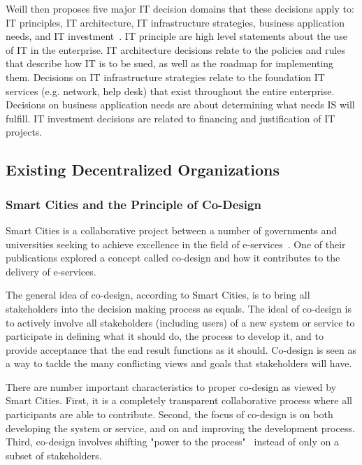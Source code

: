 Weill then proposes five major IT decision domains that these decisions apply to: IT principles, IT architecture, IT infrastructure strategies, business application needs, and IT investment~\cite{Weill2004}. IT principle are high level statements about the use of IT in the enterprise. IT architecture decisions relate to the policies and rules that describe how IT is to be sued, as well as the roadmap for implementing them. Decisions on IT infrastructure strategies relate to the foundation IT services (e.g. network, help desk) that exist throughout the entire enterprise.  Decisions on business application needs are about determining what needs IS will fulfill. IT investment decisions are related to financing and justification of IT projects.




\subsection{Existing Decentralized Organizations}

\subsubsection{Smart Cities and the Principle of Co-Design}

Smart Cities is a collaborative project between a number of governments and universities seeking to achieve excellence in the field of e-services~\cite{Cities}. One of their publications explored a concept called co-design and how it contributes to the delivery of e-services. 


The general idea of co-design, according to Smart Cities, is to bring all stakeholders into the decision making process as equals. The ideal of co-design is to actively involve all stakeholders (including users) of a new system or service to participate in defining what it should do, the process to develop it, and to provide acceptance that the end result functions as it should. Co-design is seen as a way to tackle the many conflicting views and goals that stakeholders will have. 

There are number important characteristics to proper co-design as viewed by Smart Cities. First, it is a completely transparent collaborative process where all participants are able to contribute. Second, the focus of co-design is on both developing the system or service, and on and improving the development process. Third, co-design involves shifting "power to the process"~\cite{Cities} instead of only on a subset of stakeholders.

